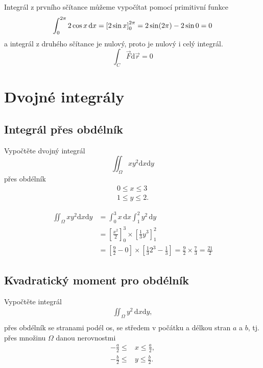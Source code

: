Integrál z prvního sčítance můžeme vypočítat pomocí primitivní funkce
$$\int_0^{2\pi} 2\cos x\,\mathrm dx=\qty[2\sin x]_0^{2\pi}=2\sin(2\pi)-2\sin 0 =0$$ a integrál z druhého sčítance je nulový, proto je nulový i celý integrál.
$$\int_C\vec F\mathrm d\vec r=0$$


\konec


\stranka
{}
\section{Dvojné integrály}

\subsection{Integrál přes obdélník}


Vypočtěte dvojný integrál $$\iint_\Omega xy^2\mathrm dx\mathrm dy$$
přes obdélník $$
\begin{gathered}
  0\leq x\leq 3\\1\leq y\leq 2.
\end{gathered}
$$

\reseni

$$
\begin{aligned}
  \iint_\Omega xy^2\mathrm dx\mathrm dy
  &=\int_0^3x\,\mathrm dx \int _1^2 y^2 \,\mathrm dy
\\&=\left[\frac {x^2}2\right]_0^3 \times \left[\frac 13 y^3 \right]_1^2
\\&=\left[\frac 92-0\right]\times \left [\frac 13 2^3 - \frac 13 \right]
=\frac 92 \times \frac 73 = \frac {21}2
\end{aligned}
$$


\konec

\subsection{Kvadratický moment pro obdélník}

Vypočtěte integrál
$$
\begin{aligned}
 \iint_\Omega y^2\,\mathrm dx \mathrm dy,\\
\end{aligned}
$$
přes obdélník se stranami podél os, se středem v počátku a délkou stran $a$ a $b$, tj. přes množinu $\Omega$ danou nerovnostmi
$$
\begin{aligned}
  -\frac a2\leq &x\leq \frac a2,\\
  -\frac b2\leq &y \leq \frac b2.
\end{aligned}
$$

